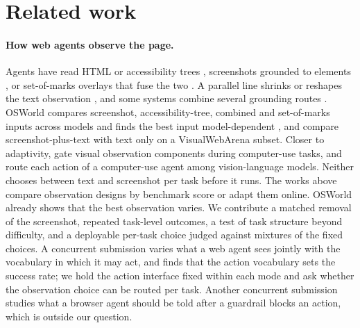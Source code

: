 \section{Related work}\label{sec:related}

\paragraph{How web agents observe the page.} Agents have read HTML or accessibility trees \citep{deng2023mind2web,agentoccam2025}, screenshots grounded to elements \citep{zheng2024seeact,he2024webvoyager,zheng2024uground}, or set-of-marks overlays that fuse the two \citep{yang2023som,koh2024visualwebarena}. A parallel line shrinks or reshapes the text observation \citep{kerboua2025focusagent,schiepanski2025d2snap,enomoto2026observation}, and some systems combine several grounding routes \citep{li2026avenirweb}. OSWorld compares screenshot, accessibility-tree, combined and set-of-marks inputs across models and finds the best input model-dependent \citep{xie2024osworld}, and \citet{chi2024elementordering} compare screenshot-plus-text with text only on a VisualWebArena subset. Closer to adaptivity, \citet{li2026aoi} gate visual observation components during computer-use tasks, and \citet{liu2026adaptivevlm} route each action of a computer-use agent among vision-language models. Neither chooses between text and screenshot per task before it runs. The works above compare observation designs by benchmark score or adapt them online. OSWorld already shows that the best observation varies. We contribute a matched removal of the screenshot, repeated task-level outcomes, a test of task structure beyond difficulty, and a deployable per-task choice judged against mixtures of the fixed choices. A concurrent submission \citep{anon2026vocabulary} varies what a web agent sees jointly with the vocabulary in which it may act, and finds that the action vocabulary sets the success rate; we hold the action interface fixed within each mode and ask whether the observation choice can be routed per task. Another concurrent submission \citep{anon2026guardrail} studies what a browser agent should be told after a guardrail blocks an action, which is outside our question.

